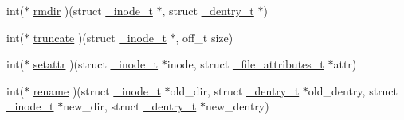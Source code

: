 \begin{DoxyCompactItemize}
int($\ast$ \hyperlink{struct__fs__instance__t_a4ceb71ff00d0a5fda03aa644c4694bef}{rmdir} )(struct \hyperlink{struct__inode__t}{\-\_\-inode\-\_\-t} $\ast$, struct \hyperlink{struct__dentry__t}{\-\_\-dentry\-\_\-t} $\ast$)
\item 
int($\ast$ \hyperlink{struct__fs__instance__t_a02c8b56a14997bf58d8350a26e441954}{truncate} )(struct \hyperlink{struct__inode__t}{\-\_\-inode\-\_\-t} $\ast$, off\-\_\-t size)
\item 
int($\ast$ \hyperlink{struct__fs__instance__t_ae76a7f1f9c4653baa497343bf26918a6}{setattr} )(struct \hyperlink{struct__inode__t}{\-\_\-inode\-\_\-t} $\ast$inode, struct \hyperlink{struct__file__attributes__t}{\-\_\-file\-\_\-attributes\-\_\-t} $\ast$attr)
\item 
int($\ast$ \hyperlink{struct__fs__instance__t_a62e37513c47dda9d11e534cf84d6f48b}{rename} )(struct \hyperlink{struct__inode__t}{\-\_\-inode\-\_\-t} $\ast$old\-\_\-dir, struct \hyperlink{struct__dentry__t}{\-\_\-dentry\-\_\-t} $\ast$old\-\_\-dentry, struct \hyperlink{struct__inode__t}{\-\_\-inode\-\_\-t} $\ast$new\-\_\-dir, struct \hyperlink{struct__dentry__t}{\-\_\-dentry\-\_\-t} $\ast$new\-\_\-dentry)
\end{DoxyCompactItemize}


